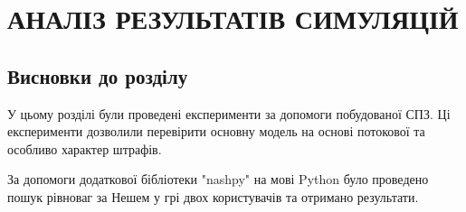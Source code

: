 
\chapter{АНАЛІЗ РЕЗУЛЬТАТІВ СИМУЛЯЦІЙ}





\section*{Висновки до розділу}

У цьому розділі були проведені експерименти за допомоги побудованої СПЗ. Ці експерименти дозволили перевірити основну модель на основі потокової та особливо характер штрафів.

За допомоги додаткової бібліотеки "nashpy" на мові Python було проведено пошук рівноваг за Нешем у грі двох користувачів та отримано результати.

